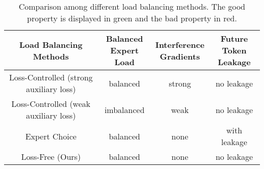 \documentclass{article} %
\newcommand{\ours}{Loss-Free Balancing}
\begin{document}
\begin{table}[t]
\caption{Comparison among different load balancing methods. The good property is displayed in \textcolor{ddmgreen}{green} and the bad property in \textcolor{ddmred}{red}.}
\label{tab:comparison_load_control_methods}
\begin{center}
\begin{tabular}{c|c|c|c}
\toprule
\textbf{Load Balancing Methods} & \makecell{\textbf{Balanced} \\ \textbf{Expert Load}} & \makecell{\textbf{Interference} \\ \textbf{Gradients}} & \makecell{\textbf{Future Token} \\ \textbf{Leakage}}\\
\midrule
Loss-Controlled (strong auxiliary loss) & \textcolor{ddmgreen}{balanced} & \textcolor{ddmred}{strong} & \textcolor{ddmgreen}{no leakage} \\
Loss-Controlled (weak auxiliary loss) & \textcolor{ddmred}{imbalanced} & \textcolor{ddmgreen}{weak} & \textcolor{ddmgreen}{no leakage} \\
Expert Choice & \textcolor{ddmgreen}{balanced}  & \textcolor{ddmgreen}{none} & \textcolor{ddmred}{with leakage} \\
\midrule
Loss-Free (Ours) & \textcolor{ddmgreen}{balanced} & \textcolor{ddmgreen}{none} & \textcolor{ddmgreen}{no leakage} \\ 
\bottomrule
\end{tabular}
\end{center}
\end{table}


\end{document}
